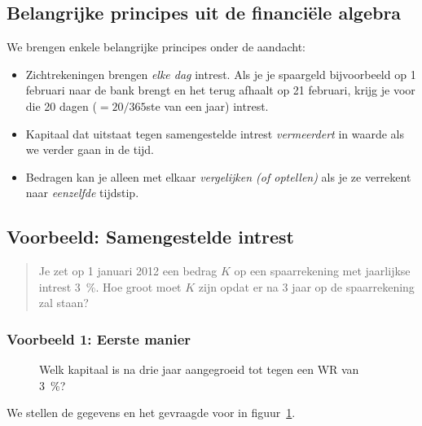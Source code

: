 \subsection{Belangrijke principes uit de financi\"{e}le
algebra}\label{sec.principes}
We brengen enkele belangrijke principes onder de aandacht:
\begin{itemize}
       \item Zichtrekeningen brengen \textit{elke dag} intrest. Als je je spaargeld bijvoorbeeld op 1 februari naar de bank brengt en het terug afhaalt op 21 februari, krijg je voor die 20 dagen ($=20/365$ste van een jaar) intrest.
    \item Kapitaal dat uitstaat tegen samengestelde intrest
      \emph{vermeerdert} in waarde als we verder gaan in de tijd.
       \item Bedragen kan je alleen met elkaar \emph{vergelijken (of optellen)}
       als je ze
       verrekent naar \emph{eenzelfde} tijdstip.
   \end{itemize}

\subsection{Voorbeeld: Samengestelde intrest}
\begin{quote}
Je zet op 1 januari 2012 een bedrag $K$ op een spaarrekening met jaarlijkse intrest \SI{3}{\percent}. Hoe groot moet $K$ zijn opdat er na 3 jaar  op de spaarrekening zal staan?
\end{quote}
\subsubsection{Voorbeeld 1: Eerste manier}
\begin{figure}[htbp]
    \centering
{}
    \caption{Welk kapitaal is na drie jaar aangegroeid tot  tegen een WR van \SI{3}{\percent}?}
    \label{fig:oef1verdertellen} 
\end{figure}
We stellen de gegevens en het gevraagde voor in figuur~\ref{fig:oef1verdertellen}.

